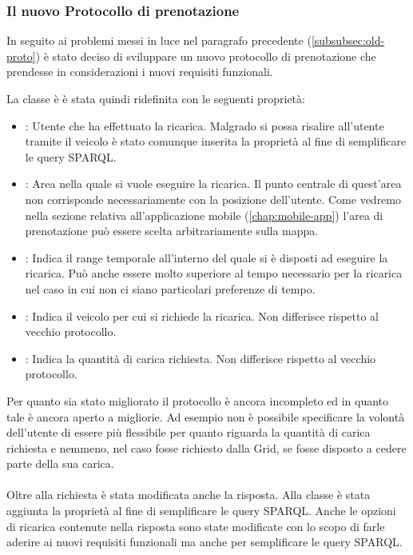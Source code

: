 \subsubsection{Il nuovo Protocollo di prenotazione}\label{subsubsec:chargerequest}

In seguito ai problemi messi in luce nel paragrafo precedente (\ref{subsubsec:old-proto}) è stato deciso di sviluppare un nuovo protocollo di prenotazione che prendesse in considerazioni i nuovi requisiti funzionali.

La classe è  è stata quindi ridefinita con le seguenti proprietà:

\begin{itemize}
	\item {}: Utente che ha effettuato la ricarica. Malgrado si possa risalire all'utente tramite il veicolo è stato comunque inserita la proprietà al fine di semplificare le query SPARQL.
	\item {}: Area nella quale si vuole eseguire la ricarica. Il punto centrale di quest'area non corrisponde necessariamente con la posizione dell'utente. Come vedremo nella sezione relativa all'applicazione mobile (\ref{chap:mobile-app}) l'area di prenotazione può essere scelta arbitrariamente sulla mappa.
	\item {}: Indica il range temporale all'interno del quale si è disposti ad eseguire la ricarica. Può anche essere molto superiore al tempo necessario per la ricarica nel caso in cui non ci siano particolari preferenze di tempo.
	\item {}: Indica il veicolo per cui si richiede la ricarica. Non differisce rispetto al vecchio protocollo.
	\item {}: Indica la quantità di carica richiesta. Non differisce rispetto al vecchio protocollo.
\end{itemize}

\noindent
Per quanto sia stato migliorato il protocollo è ancora incompleto ed in quanto tale è ancora aperto a migliorie. Ad esempio non è possibile specificare la volontà dell'utente di essere più flessibile per quanto riguarda la quantità di carica richiesta e nemmeno, nel caso fosse richiesto dalla Grid, se fosse disposto a cedere parte della sua carica.
\\ \\
Oltre alla richiesta è stata modificata anche la risposta. Alla classe  è stata aggiunta la proprietà  al fine di semplificare le query SPARQL.
Anche le opzioni di ricarica contenute nella risposta sono state modificate con lo scopo di farle aderire ai nuovi requisiti funzionali ma anche per semplificare le query SPARQL.


